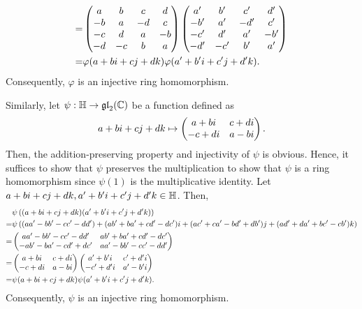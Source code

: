 {\begin{equation*}
\begin{split}
            = & \begin{pmatrix}a & b & c & d \\ -b & a & -d & c \\ -c & d & a & -b \\ -d & -c & b & a\end{pmatrix} \begin{pmatrix}a' & b' & c' & d' \\ -b' & a' & -d' & c' \\ -c' & d' & a' & -b' \\ -d' & -c' & b' & a'\end{pmatrix} \\
            = & \varphi(a+bi+cj+dk) \varphi(a'+b'i+c'j+d'k).
        \end{split}
    \end{equation*}
    Consequently, $\varphi$ is an injective ring homomorphism.
    
    Similarly, let $\psi : \mathbb{H} \to \mathfrak{gl}_{2}\!\left(\mathbb{C}\right)$ be a function defined as
    \[
        a+bi+cj+dk \mapsto \begin{pmatrix}a+bi & c+di \\ -c+di & a-bi\end{pmatrix}.
    \]
    Then, the addition-preserving property and injectivity of $\psi$ is obvious.
    Hence, it suffices to show that $\psi$ preserves the multiplication to show that $\psi$ is a ring homomorphism since $\psi(1)$ is the multiplicative identity.
    Let $a+bi+cj+dk, a'+b'i+c'j+d'k \in \mathbb{H}$.
    Then,
    \begin{equation*}
        \begin{split}
            & \psi\left((a+bi+cj+dk)(a'+b'i+c'j+d'k)\right)\\
            = & \psi\left((aa'-bb'-cc'-dd') + (ab'+ba'+cd'-dc')i + (ac'+ca'-bd'+db')j + (ad'+da'+bc'-cb')k \right) \\
            = & \begin{pmatrix}aa'-bb'-cc'-dd' & ab'+ba'+cd'-dc' \\ -ab'-ba'-cd'+dc' & aa'-bb'-cc'-dd'\end{pmatrix} \\
            = & \begin{pmatrix}a+bi & c+di \\ -c+di & a-bi\end{pmatrix} \begin{pmatrix}a'+b'i & c'+d'i \\ -c'+d'i & a'-b'i\end{pmatrix} \\
            = & \psi(a+bi+cj+dk) \psi(a'+b'i+c'j+d'k).
        \end{split}
    \end{equation*}
    Consequently, $\psi$ is an injective ring homomorphism.
}

\clearpage

